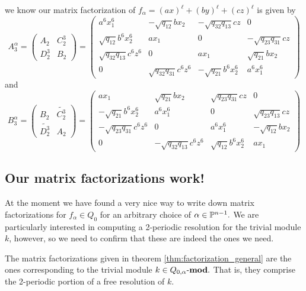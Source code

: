\documentclass [11pt, proquest] {uwthesis}[2020/02/24]
\begin{document}
    we know our matrix factorization of $f_\alpha=(ax)^\ell+(by)^\ell+(cz)^\ell$ is given by
    \[A_3^\alpha=\begin{pmatrix}
        A_{2} & C_{2}^3\\D_{2}^3& B_{2}
    \end{pmatrix}=\begin{pmatrix}
        a^6x_1^6 & -\sqrt{q_{12}}bx_2 & -\sqrt{q_{32}q_{13}}cz & 0\\ 
        \sqrt{q_{12}}b^6x_2^6 & ax_1 & 0 & -\sqrt{q_{23}q_{31}}cz\\
        \sqrt{q_{32}q_{13}}c^6z^6 & 0 & ax_1 & \sqrt{q_{21}}bx_2\\ 
        0 & \sqrt{q_{32}q_{31}}c^6z^6 &-\sqrt{q_{21}}b^6x_2^6 & a^6x_1^6
    \end{pmatrix}\]
    and
    \[B_3^\alpha=\begin{pmatrix}
        B_{2}&\widetilde{C_{2}^3}\\ \widetilde{D_{2}^3} & A_{2}
    \end{pmatrix}=\begin{pmatrix}
        ax_1 & \sqrt{q_{21}}bx_2 & \sqrt{q_{23}q_{31}}cz & 0\\ 
        -\sqrt{q_{21}}b^6x_2^6 & a^6x_1^6 & 0 & \sqrt{q_{23}q_{13}}cz\\
        -\sqrt{q_{23}q_{31}}c^6z^6 & 0 & a^6x_1^6 & -\sqrt{q_{12}}bx_2\\ 
        0 & -\sqrt{q_{32}q_{13}}c^6z^6 & \sqrt{q_{12}}b^6x_2^6 & ax_1
    \end{pmatrix}\]
    
\subsection{Our matrix factorizations work!}
    At the moment we have found a very nice way to write down matrix factorizations for $f_\alpha\in Q_0$ for an arbitrary choice of $\alpha\in\mathbb{P}^{n-1}.$ We are particularly interested in computing a 2-periodic resolution for the trivial module $k$, however, so we need to confirm that these are indeed the ones we need.
    
    \begin{conj}
        The matrix factorizations given in theorem \ref{thm:factorization_general} are the ones corresponding to the trivial module $k\in Q_{0,\alpha}\text{-}\mathbf{mod}.$ That is, they comprise the 2-periodic portion of a free resolution of $k$.
    \end{conj}
    
\end{document}
